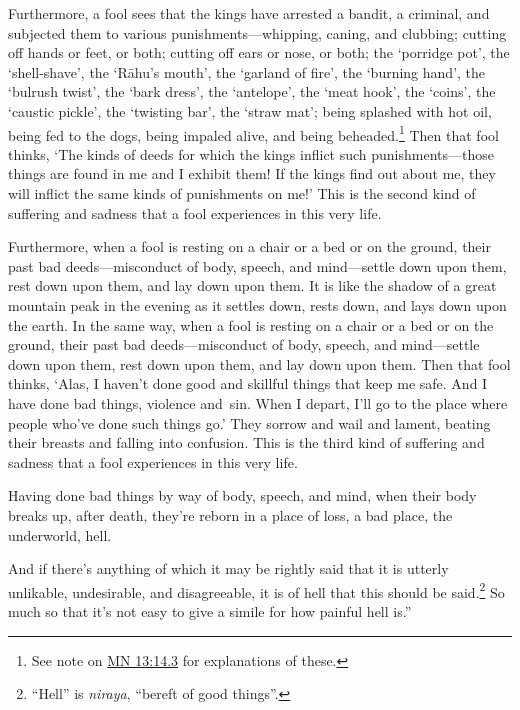 \documentclass[12pt,openany]{book}%
\begin{document}
Furthermore, a fool sees that the kings have arrested a bandit, a criminal, and subjected them to various punishments—whipping, caning, and clubbing; cutting off hands or feet, or both; cutting off ears or nose, or both; the ‘porridge pot’, the ‘shell-shave’, the ‘\textsanskrit{Rāhu}’s mouth’, the ‘garland of fire’, the ‘burning hand’, the ‘bulrush twist’, the ‘bark dress’, the ‘antelope’, the ‘meat hook’, the ‘coins’, the ‘caustic pickle’, the ‘twisting bar’, the ‘straw mat’; being splashed with hot oil, being fed to the dogs, being impaled alive, and being beheaded.\footnote{See note on \href{https://suttacentral.net/mn13/en/sujato\#14.3}{MN 13:14.3} for explanations of these. } Then that fool thinks, ‘The kinds of deeds for which the kings inflict such punishments—those things are found in me and I exhibit them! If the kings find out about me, they will inflict the same kinds of punishments on me!’ This is the second kind of suffering and sadness that a fool experiences in this very life. 

Furthermore, when a fool is resting on a chair or a bed or on the ground, their past bad deeds—misconduct of body, speech, and mind—settle down upon them, rest down upon them, and lay down upon them. It is like the shadow of a great mountain peak in the evening as it settles down, rests down, and lays down upon the earth. In the same way, when a fool is resting on a chair or a bed or on the ground, their past bad deeds—misconduct of body, speech, and mind—settle down upon them, rest down upon them, and lay down upon them. Then that fool thinks, ‘Alas, I haven’t done good and skillful things that keep me safe. And I have done bad things, violence and sin. When I depart, I’ll go to the place where people who’ve done such things go.’ They sorrow and wail and lament, beating their breasts and falling into confusion. This is the third kind of suffering and sadness that a fool experiences in this very life. 

Having done bad things by way of body, speech, and mind, when their body breaks up, after death, they’re reborn in a place of loss, a bad place, the underworld, hell. 

And if there’s anything of which it may be rightly said that it is utterly unlikable, undesirable, and disagreeable, it is of hell that this should be said.\footnote{“Hell” is \textit{niraya}, “bereft of good things”. } So much so that it’s not easy to give a simile for how painful hell is.” 
\end{document}
